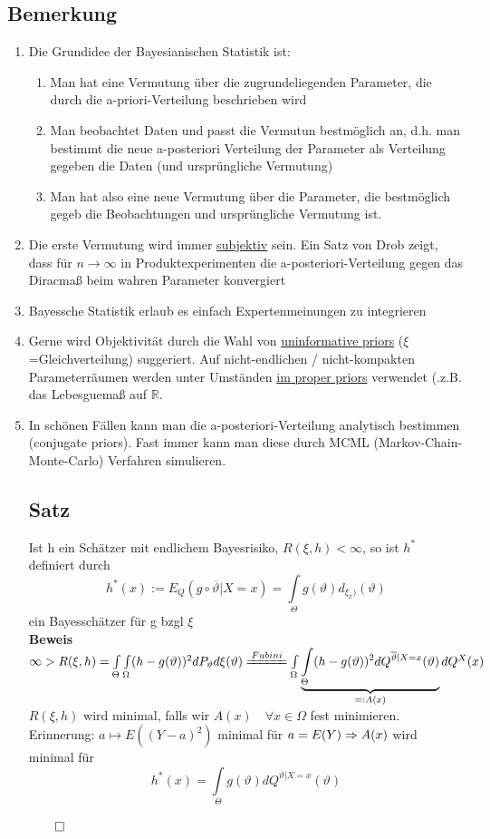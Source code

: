 \documentclass[german,10pt,oneside, fleqn, a4paper]{article}
\newcommand {\R}	{\mathbb{R}}
\newcommand{\Ra}	{\Rightarrow}
\newcommand{\QED}{\begin{flushright}$\qed$\end{flushright}}
\newcommand{\beweis}{\textbf{Beweis}\\}
\newcommand{\toinf}{\rightarrow\infty}
\newcommand{\1}[1]{1_{#1}}
\newcommand{\2}[1]{\1{\brac{#1}}}
\newcommand{\qf}{\quad\forall}
\begin{document}
\subsection{Bemerkung}
\label{14.3}
\begin{enumerate}[label=(\alph*)]
\item Die Grundidee der Bayesianischen Statistik ist:
\begin{enumerate}
	\item Man hat eine Vermutung über die zugrundeliegenden Parameter, die durch die a-priori-Verteilung beschrieben wird
	\item Man beobachtet Daten und passt die Vermutun bestmöglich an, d.h. man bestimmt die neue a-posteriori Verteilung der Parameter als Verteilung gegeben die Daten (und ursprüngliche Vermutung)
	\item Man hat also eine neue Vermutung über die Parameter, die bestmöglich gegeb die Beobachtungen und ursprüngliche Vermutung ist.
\end{enumerate}	
\item Die erste Vermutung wird immer \underline{subjektiv} sein. Ein Satz von Drob zeigt, dass für $n\toinf$ in Produktexperimenten die a-posteriori-Verteilung gegen das Diracmaß beim wahren Parameter konvergiert
\item Bayessche Statistik erlaub es einfach \glqq Expertenmeinungen \grqq zu integrieren
\item Gerne wird Objektivität durch die Wahl von \underline{uninformative priors} ($\xi$=Gleichverteilung) suggeriert. Auf nicht-endlichen / nicht-kompakten Parameterräumen werden unter Umständen \underline{im proper priors} verwendet (.z.B. das Lebesguemaß auf $\R$.
\item In schönen Fällen kann man die a-posteriori-Verteilung analytisch bestimmen (conjugate priors). Fast immer kann man diese durch MCML (Markov-Chain-Monte-Carlo) Verfahren simulieren.

\subsection{Satz}
\label{14.4}
Ist h ein Schätzer mit endlichem Bayesrisiko, $R(\xi,h)<\infty$, so ist $h^*$ definiert durch\[h^*(x):=E_Q(g\circ\overline\vartheta|X=x)=\int\limits_\Theta g(\vartheta)d_{\xi_x)}(\vartheta)\]
ein Bayesschätzer für g bzgl $\xi$\\
\beweis
$\infty>R(\xi,h)=\int\limits_\Theta\int\limits_\Omega (h-g(\vartheta))^2dP_\vartheta d\xi(\vartheta)\xlongequal{Fubini}\int\limits_\Omega\underbrace{\int\limits_\Theta (h-g(\vartheta))^2dQ^{\overline\vartheta|X=x}(\vartheta)}_{=:A(x)}dQ^X(x)$\\
$R(\xi,h)$ wird minimal, falls wir $A(x)\qf x\in\Omega$ fest minimieren.\\
Erinnerung: $a\mapsto E((Y-a)^2)$ minimal für $a=E(Y)\\
\Ra A(x)$ wird minimal für \[
h^*(x)=\int\limits_\Theta g(\vartheta)dQ^{\overline\vartheta|X=x}(\vartheta)\]\QED
\end{enumerate}
\end{document}
